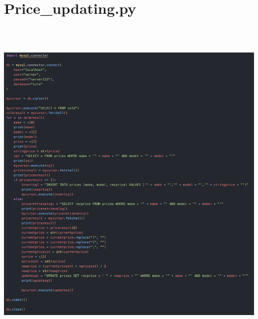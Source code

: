 \section*{Price\_updating.py}\includegraphics[width=6.26806in,height=6.58056in]{ch6_appendix/media/image17.png}

